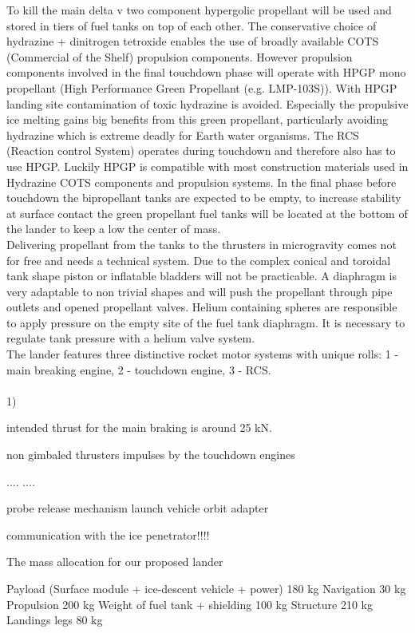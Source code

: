 To kill the main delta v two component hypergolic propellant will be used and stored in tiers of fuel tanks on top of each other. The conservative  choice of hydrazine + dinitrogen tetroxide enables the  use of broadly available COTS (Commercial of the Shelf) propulsion components. However propulsion components involved in the final touchdown phase will operate with HPGP mono propellant (High Performance Green Propellant (e.g. LMP-103S)). With HPGP landing site contamination of toxic hydrazine is avoided. Especially the propulsive ice melting gains big benefits from this green propellant, particularly avoiding hydrazine which is extreme deadly for Earth water organisms. The RCS (Reaction control System) operates during touchdown and therefore also has to use HPGP. Luckily HPGP is compatible with most construction materials used in Hydrazine COTS components and propulsion systems. In the final phase before touchdown the bipropellant tanks are expected to be empty, to increase stability at surface contact the green propellant fuel tanks will be located at the bottom of the lander to keep a low the center of mass.\\
Delivering propellant from the tanks to the thrusters in microgravity comes not for free and needs a technical system. Due to the complex conical and toroidal tank shape piston or inflatable bladders will not be practicable. A diaphragm is very adaptable to non trivial shapes and will push the propellant through pipe outlets and opened propellant valves. Helium containing spheres  are responsible to apply pressure on the empty site of the fuel tank diaphragm. It is necessary to regulate tank pressure with a helium valve system.\\
The lander features three distinctive rocket motor systems with unique rolls: 1 - main breaking engine, 2 - touchdown engine, 3 - RCS.\\
\\
1) 


intended thrust for the main braking is around 25 kN.  

non gimbaled thrusters
impulses by the touchdown engines


....
....


probe release mechanism 
launch vehicle orbit adapter

communication with the ice penetrator!!!!


The mass allocation for our proposed lander

Payload (Surface module + ice-descent vehicle + power) 180 kg
Navigation 30 kg
Propulsion 200 kg
Weight of fuel tank + shielding 100 kg
Structure 210 kg
Landings legs 80 kg

